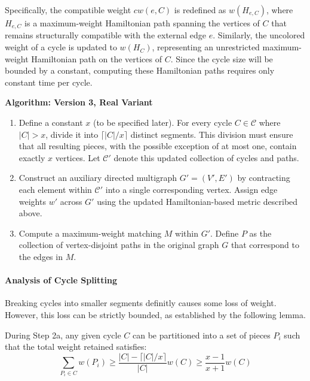 Specifically, the compatible weight $cw(e, C)$ is redefined as $w(H_{e, C})$,
where $H_{e, C}$ is a maximum-weight Hamiltonian path spanning the vertices of
$C$ that remains structurally compatible with the external edge $e$. Similarly,
the uncolored weight of a cycle is updated to $w(H_C)$, representing an
unrestricted maximum-weight Hamiltonian path on the vertices of $C$. Since the
cycle size will be bounded by a constant, computing these Hamiltonian paths
requires only constant time per cycle.

\vspace{0.5em}
\noindent\textbf{Algorithm: Version 3, Real Variant}
\begin{enumerate}[label=\textbf{Step 2\alph*.}, leftmargin=*]
    \item Define a constant $x$ (to be specified later). For every cycle $C \in
    \mathcal{C}$ where $|C| > x$, divide it into $\lceil |C|/x \rceil$ distinct
    segments. This division must ensure that all resulting pieces, with the
    possible exception of at most one, contain exactly $x$ vertices. Let
    $\mathcal{C}'$ denote this updated collection of cycles and paths.
    \item Construct an auxiliary directed multigraph $G' = (V', E')$ by
    contracting each element within $\mathcal{C}'$ into a single corresponding
    vertex. Assign edge weights $w'$ across $G'$ using the updated
    Hamiltonian-based metric described above.
    \item Compute a maximum-weight matching $M$ within $G'$. Define $P$ as the
    collection of vertex-disjoint paths in the original graph $G$ that
    correspond to the edges in $M$.
\end{enumerate}
\vspace{0.5em}

\paragraph{Analysis of Cycle Splitting}
Breaking cycles into smaller segments definitly  causes some loss of weight.
However, this loss can be strictly bounded, as established by the following
lemma.

\begin{lemma} \label{lemma:cycle_splitting}
During Step 2a, any given cycle $C$ can be partitioned into a set of pieces
$P_i$ such that the total weight retained satisfies:
$$ \sum_{P_i \in C} w(P_i) \ge \frac{|C| - \lceil|C|/x\rceil}{|C|} w(C) \ge
\frac{x-1}{x+1}w(C) $$
\end{lemma}

